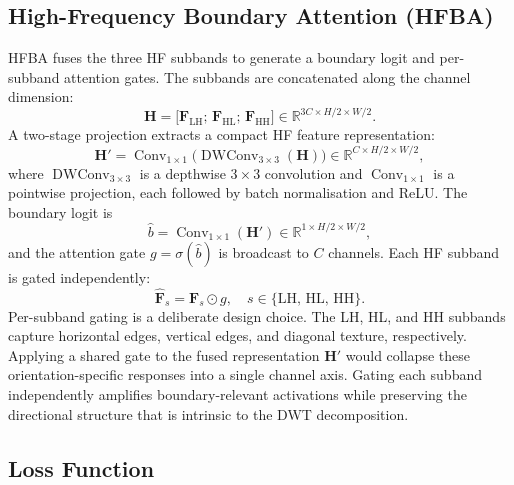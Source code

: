 \documentclass[journal]{IEEEtran}
\begin{document}
\subsection{High-Frequency Boundary Attention (HFBA)}\label{sec:method:hfba}

HFBA fuses the three HF subbands to generate a boundary logit and per-subband
attention gates.
The subbands are concatenated along the channel dimension:
\begin{equation}
  \mathbf{H} =
    \bigl[\mathbf{F}_{\text{LH}};\,\mathbf{F}_{\text{HL}};\,\mathbf{F}_{\text{HH}}\bigr]
    \in \mathbb{R}^{3C \times H/2 \times W/2}.
  \label{eq:hfba_concat}
\end{equation}
A two-stage projection extracts a compact HF feature representation:
\begin{equation}
  \mathbf{H}' = \operatorname{Conv}_{1\times1}\!\bigl(
    \operatorname{DWConv}_{3\times3}(\mathbf{H})\bigr)
    \in \mathbb{R}^{C \times H/2 \times W/2},
  \label{eq:hfba_proj}
\end{equation}
where $\operatorname{DWConv}_{3\times3}$ is a depthwise $3\times3$ convolution
and $\operatorname{Conv}_{1\times1}$ is a pointwise projection, each followed by
batch normalisation and ReLU.
The boundary logit is
\begin{equation}
  \hat{b} = \operatorname{Conv}_{1\times1}(\mathbf{H}')
    \in \mathbb{R}^{1 \times H/2 \times W/2},
  \label{eq:hfba_logit}
\end{equation}
and the attention gate $g = \sigma(\hat{b})$ is broadcast to $C$ channels.
Each HF subband is gated independently:
\begin{equation}
  \hat{\mathbf{F}}_{s} = \mathbf{F}_{s} \odot g,
  \quad s \in \{\text{LH},\,\text{HL},\,\text{HH}\}.
  \label{eq:hfba_gate}
\end{equation}
Per-subband gating is a deliberate design choice.
The LH, HL, and HH subbands capture horizontal edges, vertical edges, and
diagonal texture, respectively.
Applying a shared gate to the fused representation $\mathbf{H}'$ would
collapse these orientation-specific responses into a single channel axis.
Gating each subband independently amplifies boundary-relevant activations
while preserving the directional structure that is intrinsic to the DWT
decomposition.

\subsection{Loss Function}\label{sec:method:loss}
\end{document}
